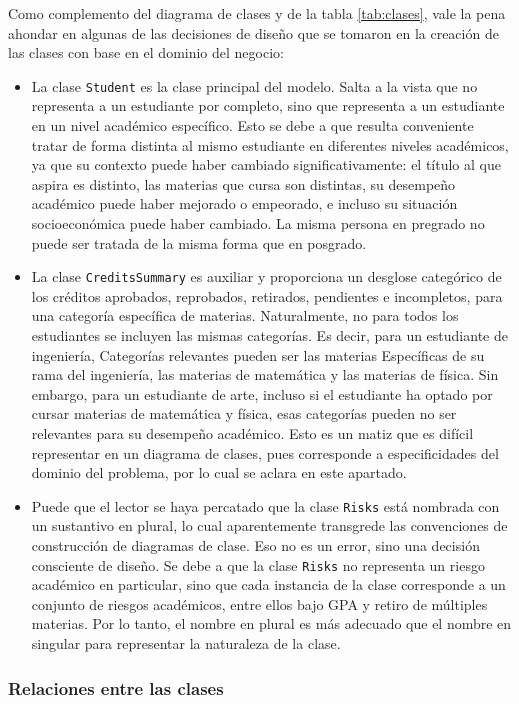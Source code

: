 Como complemento del diagrama de clases y de la tabla \ref{tab:clases}, vale la pena ahondar en algunas de las decisiones de diseño que se tomaron en la creación de las clases con base en el dominio del negocio:
\begin{itemize}
	\item La clase \lstinline|Student| es la clase principal del modelo. Salta a la vista que no representa a un estudiante por completo, sino que representa a un estudiante en un nivel académico específico. Esto se debe a que resulta conveniente tratar de forma distinta al mismo estudiante en diferentes niveles académicos, ya que su contexto puede haber cambiado significativamente: el título al que aspira es distinto, las materias que cursa son distintas, su desempeño académico puede haber mejorado o empeorado, e incluso su situación socioeconómica puede haber cambiado. La misma persona en pregrado no puede ser tratada de la misma forma que en posgrado.
	\item La clase \lstinline|CreditsSummary| es auxiliar y proporciona un desglose categórico de los créditos aprobados, reprobados, retirados, pendientes e incompletos, para una categoría específica de materias. Naturalmente, no para todos los estudiantes se incluyen las mismas categorías. Es decir, para un estudiante de ingeniería, Categorías relevantes pueden ser las materias Específicas de su rama del ingeniería, las materias de matemática y las materias de física. Sin embargo, para un estudiante de arte, incluso si el estudiante ha optado por cursar materias de matemática y física, esas categorías pueden no ser relevantes para su desempeño académico. Esto es un matiz que es difícil representar en un diagrama de clases, pues corresponde a especificidades del dominio del problema, por lo cual se aclara en este apartado.
	\item Puede que el lector se haya percatado que la clase \lstinline|Risks| está nombrada con un sustantivo en plural, lo cual aparentemente transgrede las convenciones de construcción de diagramas de clase. Eso no es un error, sino una decisión consciente de diseño. Se debe a que la clase \lstinline|Risks| no representa un riesgo académico en particular, sino que cada instancia de la clase corresponde a un conjunto de riesgos académicos, entre ellos bajo GPA y retiro de múltiples materias. Por lo tanto, el nombre en plural es más adecuado que el nombre en singular para representar la naturaleza de la clase.
\end{itemize}

\subsubsection{Relaciones entre las clases}

